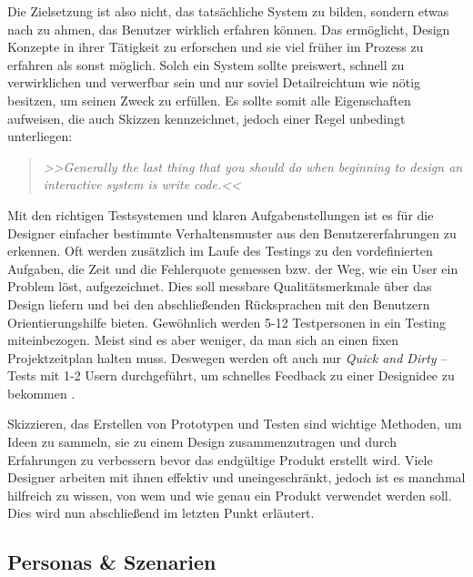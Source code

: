 Die Zielsetzung ist also nicht, das tatsächliche System zu bilden, sondern etwas nach zu ahmen, das Benutzer wirklich erfahren können. Das ermöglicht, Design Konzepte in ihrer Tätigkeit zu erforschen und sie viel früher im Prozess zu erfahren als sonst möglich. Solch ein System sollte preiswert, schnell zu verwirklichen und verwerfbar sein und nur soviel Detailreichtum wie nötig besitzen, um seinen Zweck zu erfüllen. Es sollte somit alle Eigenschaften aufweisen, die auch Skizzen kennzeichnet, jedoch einer Regel unbedingt unterliegen: 

\begin{quote}
	\textsl{>>Generally the last thing that you should do when beginning to design an interactive system is write code.<<}
\begin{flushright}\citep{Buxton:2007}\end{flushright}
\end{quote}	

Mit den richtigen Testsystemen und klaren Aufgabenstellungen ist es für die Designer einfacher bestimmte Verhaltensmuster aus den Benutzererfahrungen zu erkennen. Oft werden zusätzlich im Laufe des Testings zu den vordefinierten Aufgaben, die Zeit und die Fehlerquote gemessen bzw. der Weg, wie ein User ein Problem löst, aufgezeichnet. Dies soll messbare Qualitätsmerkmale über das Design liefern und bei den abschließenden Rücksprachen mit den Benutzern Orientierungshilfe bieten.
Gewöhnlich werden 5-12 Testpersonen in ein Testing miteinbezogen. \citep{Dumas:1999} Meist sind es aber weniger, da man sich an einen fixen Projektzeitplan halten muss. Deswegen werden oft auch nur \emph{Quick and Dirty} – Tests mit 1-2 Usern durchgeführt, um schnelles Feedback zu einer Designidee zu bekommen \citep{Sharp:2002}.

\medskip Skizzieren, das Erstellen von Prototypen und Testen sind wichtige Methoden, um Ideen zu sammeln, sie zu einem Design zusammenzutragen und durch Erfahrungen zu verbessern bevor das endgültige Produkt erstellt wird. Viele Designer arbeiten mit ihnen effektiv und uneingeschränkt, jedoch ist es manchmal hilfreich zu wissen, von wem und wie genau ein Produkt verwendet werden soll. Dies wird nun abschließend im letzten Punkt erläutert.

\subsection{Personas \& Szenarien}  

